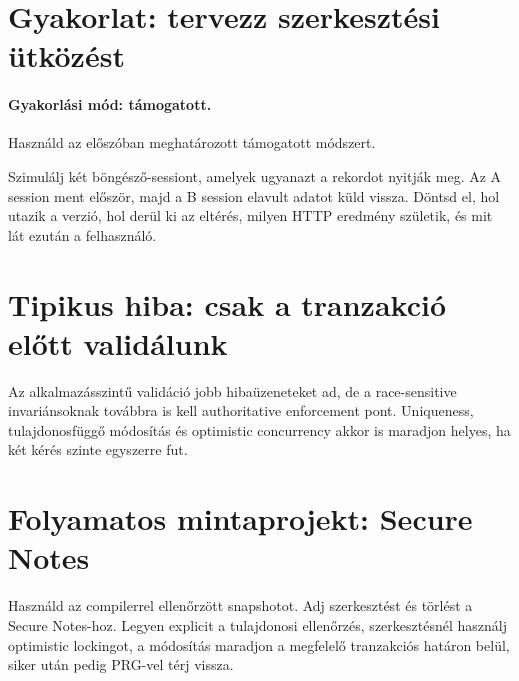 \section{Gyakorlat: tervezz szerkesztési ütközést}
\paragraph{Gyakorlási mód: támogatott.} Használd az előszóban meghatározott támogatott módszert.

Szimulálj két böngésző-sessiont, amelyek ugyanazt a rekordot nyitják meg. Az A session ment először, majd a B session elavult adatot küld vissza. Döntsd el, hol utazik a verzió, hol derül ki az eltérés, milyen HTTP eredmény születik, és mit lát ezután a felhasználó.

\section{Tipikus hiba: csak a tranzakció előtt validálunk}
Az alkalmazásszintű validáció jobb hibaüzeneteket ad, de a race-sensitive invariánsoknak továbbra is kell authoritative enforcement pont. Uniqueness, tulajdonosfüggő módosítás és optimistic concurrency akkor is maradjon helyes, ha két kérés szinte egyszerre fut.

\section{Folyamatos mintaprojekt: Secure Notes}
Használd az  compilerrel ellenőrzött snapshotot. Adj szerkesztést és törlést a Secure Notes-hoz. Legyen explicit a tulajdonosi ellenőrzés, szerkesztésnél használj optimistic lockingot, a módosítás maradjon a megfelelő tranzakciós határon belül, siker után pedig PRG-vel térj vissza.
